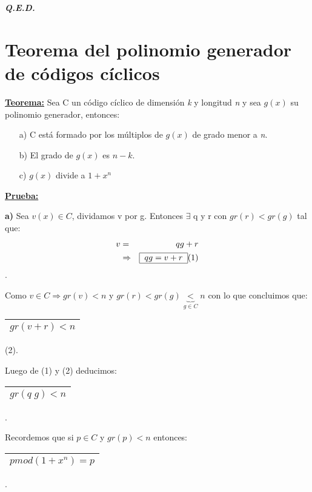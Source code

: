 \documentclass[12pt,a4paper]{report}
\newcommand{\QED}{\hfill \textit{\textbf{Q.E.D.}}}
\begin{document}
		\QED

	\section{Teorema del polinomio generador de códigos cíclicos}
		\textbf{\underline{Teorema:}} Sea C un código cíclico de dimensión \textit{k} y longitud \textit{n} y sea $g(x)$ su polinomio generador, entonces:
			\begin{itemize}
				\item[a)] C está formado por los múltiplos de $g(x)$ de grado menor a \textit{n}.
				\item[b)] El grado de $g(x)$ es $n - k$.
				\item[c)] $g(x)$ divide a $1 + x^{n}$
			\end{itemize}

		\textbf{\underline{Prueba:}}
			\par \textbf{a)} Sea $v(x) \in C$, dividamos v por g. Entonces $\exists$ q y r con $gr(r) < gr(g)$ tal que:
			\begin{eqnarray}
				\nonumber v &=& q g + r \\
				\nonumber & \Rightarrow & \begin{tabular}{|c|} \hline $q g = v + r $ \\ \hline \end{tabular} (1)
			\end{eqnarray}.

			\par Como $v \in C \Rightarrow gr(v) < n$ y $gr(r) < gr(g) \underbrace{<}_{g \in C} n $ con lo que concluimos que:
			\begin{center}
				\begin{tabular}{|c|} \hline $gr(v + r) < n $ \\ \hline \end{tabular} (2).
			\end{center}
			\par Luego de (1) y (2) deducimos: \begin{tabular}{|c|} \hline $gr(q \; g) < n $ \\ \hline \end{tabular}.

			\vspace{3mm}
			\par Recordemos que si $p \in C$ y $gr(p) < n$ entonces: \begin{tabular}{|c|} \hline $p mod (1+ x^{n}) = p$ \\\hline \end{tabular}.
\end{document}
